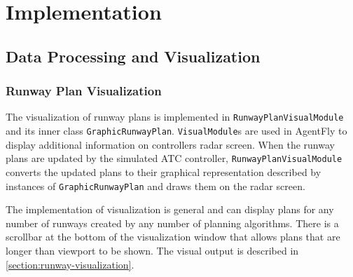 \chapter{Implementation}

\label{section:implementation}

\section{Data Processing and Visualization}


\subsection{Runway Plan Visualization}

The visualization of runway plans is implemented in \texttt{RunwayPlanVisualModule} and its inner class \texttt{GraphicRunwayPlan}. \texttt{VisualModule}s are used in AgentFly to display additional information on controllers radar screen. When the runway plans are updated by the simulated ATC controller, \texttt{RunwayPlanVisualModule} converts the updated plans to their graphical representation described by instances of \texttt{GraphicRunwayPlan} and draws them on the radar screen.

The implementation of visualization is general and can display plans for any number of runways created by any number of planning algorithms. There is a scrollbar at the bottom of the visualization window that allows plans that are longer than viewport to be shown. The visual output is described in \ref{section:runway-visualization}.

